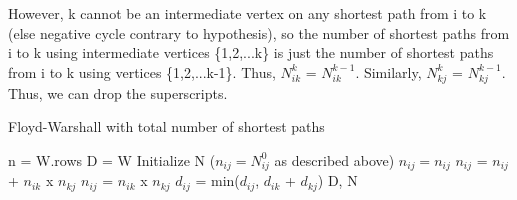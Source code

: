 \documentclass[11pt,a4paper]{article}
\begin{document}
However, k cannot be an intermediate vertex on any shortest path from i to k (else negative cycle contrary to hypothesis), so the number of shortest paths from i to k using intermediate vertices \{1,2,...k\} is just the number of shortest paths from i to k using vertices \{1,2,...k-1\}. Thus, $N_{ik}^{k}$ = $N_{ik}^{k-1}$. Similarly, $N_{kj}^{k}$ = $N_{kj}^{k-1}$. Thus, we can drop the superscripts.


\begin{algorithm}
\caption{Floyd-Warshall with total number of shortest paths}
\begin{algorithmic}[1]
 \State n = W.rows
 \State D = W
 \State Initialize N ($n_{ij} = N_{ij}^{0}$ as described above)
 			\State $n_{ij} = n_{ij}$
 			\State $n_{ij}$ = $n_{ij}$ + $n_{ik}$ x $n_{kj}$
 		\Else
 			\State $n_{ij}$ = $n_{ik}$ x $n_{kj}$
 		\EndIf
 		\State $d_{ij}$ = min($d_{ij}$, $d_{ik}$ + $d_{kj}$)
 	\EndFor
 \EndFor
 \State \Return D, N
\EndFunction
\end{algorithmic}
\end{algorithm}
\end{document}
